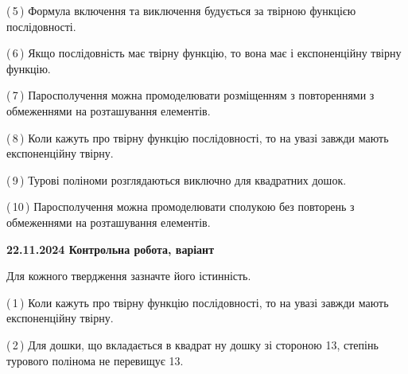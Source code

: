 \documentclass[12pt, ukrainian]{article}
\begin{document}
\begin {large}
\begin {large}
\begin {large}
\begin {large}
\begin {large}
\begin {large}
\begin {large}
\begin {large}
\begin {large}
\begin {large}
\begin {large}
\begin {large}
\begin {large}
\begin {large}
\begin {large}
\begin {large}
\begin {large}
\begin {large}
\begin {large}
\begin {large}
\begin {large}
\begin {large}
\begin {large}
\begin {large}
\begin {large}
\begin {large}
\begin {large}
\begin {large}
\begin {large}
\begin {large}
\begin {large}
\begin {large}
\begin {large}
\begin {large}
\begin {large}
\begin {large}
\begin {large}
\begin {large}
\begin {large}
\begin {large}
{(\,5\,) Формула включення та виключення будується за твірною функцією послідовності.%



(\,6\,) Якщо послідовність має твірну функцію, то вона має і експоненційну твірну функцію.%



(\,7\,) Паросполучення можна промоделювати розміщенням з повтореннями з обмеженнями на розташування елементів.%



(\,8\,) Коли кажуть про твірну функцію послідовності, то на увазі завжди мають експоненційну твірну.%



(\,9\,) Турові поліноми розглядаються виключно для квадратних дошок.%



(\,10\,) Паросполучення можна промоделювати сполукою без повторень з обмеженнями на розташування елементів.%




\vspace{5mm}
}
\newpage

\begin {large}

\textbf{22.11.2024 Контрольна робота, варіант  }\par


{
Для кожного твердження зазначте його істинність.\par

\vspace{2mm}

(\,1\,) Коли кажуть про твірну функцію послідовності, то на увазі завжди мають експоненційну твірну.%



(\,2\,) Для дошки, що вкладається в квадрат ну дошку зі стороною 13, степінь турового полінома не перевищує 13.%



}
\end{large}
\end{large}
\end{large}
\end{large}
\end{large}
\end{large}
\end{large}
\end{large}
\end{large}
\end{large}
\end{large}
\end{large}
\end{large}
\end{large}
\end{large}
\end{large}
\end{large}
\end{large}
\end{large}
\end{large}
\end{large}
\end{large}
\end{large}
\end{large}
\end{large}
\end{large}
\end{large}
\end{large}
\end{large}
\end{large}
\end{large}
\end{large}
\end{large}
\end{large}
\end{large}
\end{large}
\end{large}
\end{large}
\end{large}
\end{large}
\end{large}
\end{document}
